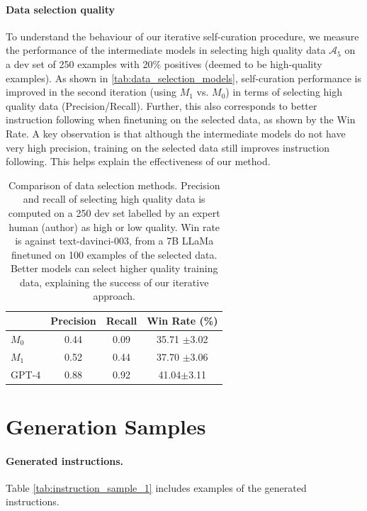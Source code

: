 \paragraph{Data selection quality}

To understand the behaviour of our iterative self-curation procedure, we measure the performance of the intermediate models in selecting high quality data $\mathcal{A}_5$ on 
a dev set of 250 examples with 20\% positives (deemed to be high-quality examples). As  shown in \autoref{tab:data_selection_models}, 
self-curation performance is improved in the second iteration (using $M_1$ vs. $M_0$) in terms of selecting high quality data (Precision/Recall). Further,
this also corresponds to better instruction following when finetuning on the selected data, as shown by the Win Rate. A key observation is that although the intermediate models do not have very high precision, training on the selected data still improves instruction following. This helps explain the effectiveness of our method.  
\begin{table}[t]
  \caption{Comparison of data selection methods. Precision and recall of selecting high quality data is computed on a 250 dev set labelled by an expert human (author) as high or low quality. Win rate is against text-davinci-003, from a 7B LLaMa finetuned on 100 examples of the selected data.
    Better models can select higher quality training data, explaining the success of our iterative approach. \label{tab:data_selection_models}
    }
  \centering
  \begin{tabular}{lccc}
    \toprule
        & \textbf{Precision} & \textbf{Recall}  &  \textbf{Win Rate (\%)}  \\
    \midrule
    $M_0$ & 0.44  & 0.09 &  35.71 $\pm$3.02   \\ 
   $M_1$ & 0.52 & 0.44 &   37.70 $\pm$3.06   \\
    \midrule
    GPT-4 & 0.88 & 0.92 &  41.04$\pm$3.11    \\
   
    \bottomrule
  \end{tabular}
\vspace{1mm}

\end{table}

\section{Generation Samples}

\paragraph{Generated instructions.} Table \ref{tab:instruction_sample_1} includes examples of the generated instructions.


